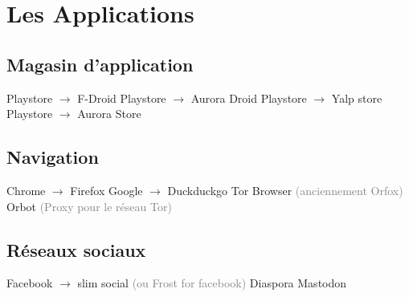 \documentclass[aspectratio=169]{beamer}
\begin{document}

\section{Les Applications}

\begin{frame}
\begin{center}
\huge{\color{cvp}{Les Applications}}
\end{center}
\end{frame}

\subsection{Magasin d'application}

\begin{frame}
Playstore $\to$ F-Droid\newline
Playstore $\to$ Aurora Droid\newline
\newline
Playstore $\to$ Yalp store\newline
Playstore $\to$ Aurora Store
\end{frame}

\subsection{Navigation}
\begin{frame}
Chrome $\to$ Firefox\newline
Google $\to$ Duckduckgo\newline
\newline
Tor Browser \textcolor{gray}{\tiny{(anciennement Orfox)}}\newline
\newline
Orbot \textcolor{gray}{\tiny{(Proxy pour le réseau Tor)}}
\end{frame}

\subsection{Réseaux sociaux}
\begin{frame}
Facebook $\to$ slim social \textcolor{gray}{\tiny{(ou Frost for facebook)}}\newline
\newline
Diaspora\newline
Mastodon
\end{frame}
\end{document}
